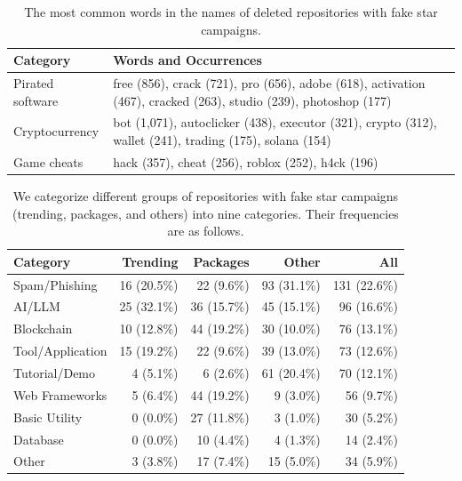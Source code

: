 \begin{table}[t]
    \small
    \centering
    \caption{The most common words in the names of deleted repositories with fake star campaigns.}
    \label{tab:common-words}
    \begin{tabular}{lp{10cm}}
    \toprule
        Category & Words and Occurrences \\
    \midrule
        Pirated software & free (856), crack (721), pro (656), adobe (618), activation (467), cracked (263), studio (239), photoshop (177) \\
        Cryptocurrency & bot (1,071), autoclicker (438), executor (321), crypto (312), wallet (241), trading (175), solana (154)\\ 
        Game cheats & hack (357), cheat (256), roblox (252), h4ck (196)\\
    \bottomrule
    \end{tabular}

\end{table}


\begin{table}[t]
    \small
    \setlength{\tabcolsep}{4.5pt}
    \centering
    \caption{We categorize different groups of repositories with fake star campaigns (trending, packages, and others) into nine categories. Their frequencies are as follows.}
    \begin{tabular}{lrrrr}
    \toprule
       Category & Trending & Packages & Other & All  \\
    \midrule
        \textsf{Spam/Phishing} & 16 (20.5\%) & 22 (9.6\%) & 93 (31.1\%) & 131 (22.6\%)\\
        \textsf{AI/LLM} & 25 (32.1\%) & 36 (15.7\%) & 45 (15.1\%) & 96 (16.6\%)\\
        \textsf{Blockchain} & 10 (12.8\%) & 44 (19.2\%) & 30 (10.0\%) & 76 (13.1\%) \\
        \textsf{Tool/Application} & 15 (19.2\%) & 22 (9.6\%) & 39 (13.0\%) & 73 (12.6\%)\\
        \textsf{Tutorial/Demo} & 4 (5.1\%) & 6 (2.6\%) & 61 (20.4\%) &  70 (12.1\%)\\
        \textsf{Web Frameworks} & 5 (6.4\%) & 44 (19.2\%) & 9 (3.0\%) & 56 (9.7\%) \\
        \textsf{Basic Utility} & 0 (0.0\%) & 27 (11.8\%) & 3 (1.0\%) & 30 (5.2\%) \\
        \textsf{Database} & 0 (0.0\%) & 10 (4.4\%) & 4 (1.3\%) & 14 (2.4\%)\\
        \textsf{Other} & 3 (3.8\%) & 17 (7.4\%) & 15 (5.0\%) & 34 (5.9\%) \\ 
    \bottomrule
    \end{tabular}
    \label{tab:repo-labels}
\end{table}


